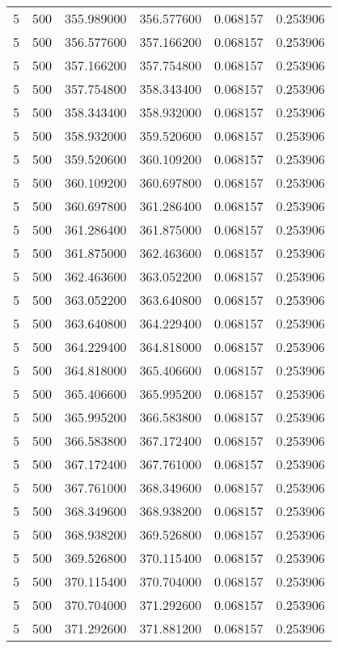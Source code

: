 \begin{longtable}{rrrrrr}
5 & 500 & 355.989000 & 356.577600 & 0.068157 & 0.253906 \\
5 & 500 & 356.577600 & 357.166200 & 0.068157 & 0.253906 \\
5 & 500 & 357.166200 & 357.754800 & 0.068157 & 0.253906 \\
5 & 500 & 357.754800 & 358.343400 & 0.068157 & 0.253906 \\
5 & 500 & 358.343400 & 358.932000 & 0.068157 & 0.253906 \\
5 & 500 & 358.932000 & 359.520600 & 0.068157 & 0.253906 \\
5 & 500 & 359.520600 & 360.109200 & 0.068157 & 0.253906 \\
5 & 500 & 360.109200 & 360.697800 & 0.068157 & 0.253906 \\
5 & 500 & 360.697800 & 361.286400 & 0.068157 & 0.253906 \\
5 & 500 & 361.286400 & 361.875000 & 0.068157 & 0.253906 \\
5 & 500 & 361.875000 & 362.463600 & 0.068157 & 0.253906 \\
5 & 500 & 362.463600 & 363.052200 & 0.068157 & 0.253906 \\
5 & 500 & 363.052200 & 363.640800 & 0.068157 & 0.253906 \\
5 & 500 & 363.640800 & 364.229400 & 0.068157 & 0.253906 \\
5 & 500 & 364.229400 & 364.818000 & 0.068157 & 0.253906 \\
5 & 500 & 364.818000 & 365.406600 & 0.068157 & 0.253906 \\
5 & 500 & 365.406600 & 365.995200 & 0.068157 & 0.253906 \\
5 & 500 & 365.995200 & 366.583800 & 0.068157 & 0.253906 \\
5 & 500 & 366.583800 & 367.172400 & 0.068157 & 0.253906 \\
5 & 500 & 367.172400 & 367.761000 & 0.068157 & 0.253906 \\
5 & 500 & 367.761000 & 368.349600 & 0.068157 & 0.253906 \\
5 & 500 & 368.349600 & 368.938200 & 0.068157 & 0.253906 \\
5 & 500 & 368.938200 & 369.526800 & 0.068157 & 0.253906 \\
5 & 500 & 369.526800 & 370.115400 & 0.068157 & 0.253906 \\
5 & 500 & 370.115400 & 370.704000 & 0.068157 & 0.253906 \\
5 & 500 & 370.704000 & 371.292600 & 0.068157 & 0.253906 \\
5 & 500 & 371.292600 & 371.881200 & 0.068157 & 0.253906 \\

\end{longtable}
